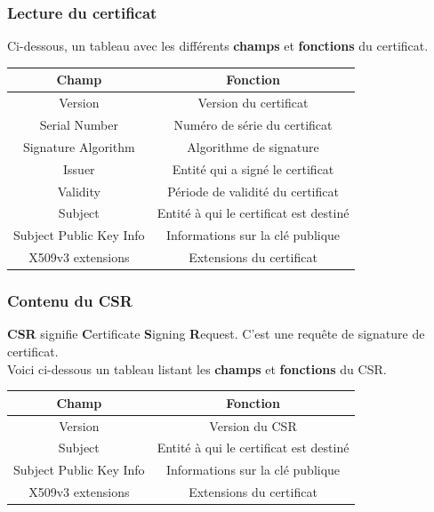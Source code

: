 \documentclass[12pt, a4paper]{article}
\begin{document}
    \subsubsection{Lecture du certificat}
    Ci-dessous, un tableau avec les différents \textbf{champs}
    et \textbf{fonctions} du certificat.
    \begin{center}
        \begin{tabular}{|c|c|}
            \hline
            \textbf{Champ} & \textbf{Fonction} \\
            \hline
            Version & Version du certificat \\
            \hline
            Serial Number & Numéro de série du certificat \\
            \hline
            Signature Algorithm & Algorithme de signature \\
            \hline
            Issuer & Entité qui a signé le certificat \\
            \hline
            Validity & Période de validité du certificat \\
            \hline
            Subject & Entité à qui le certificat est destiné \\
            \hline
            Subject Public Key Info & Informations sur la clé publique \\
            \hline
            X509v3 extensions & Extensions du certificat \\
            \hline
        \end{tabular}
    \end{center}

    \subsubsection{Contenu du CSR}
    \textbf{CSR} signifie \textbf{C}ertificate \textbf{S}igning \textbf{R}equest. C'est une requête de signature de certificat.\\
    Voici ci-dessous un tableau listant les \textbf{champs} et \textbf{fonctions} du CSR.
    \begin{center}
        \begin{tabular}{|c|c|}
            \hline
            \textbf{Champ} & \textbf{Fonction} \\
            \hline
            Version & Version du CSR \\
            \hline
            Subject & Entité à qui le certificat est destiné \\
            \hline
            Subject Public Key Info & Informations sur la clé publique \\
            \hline
            X509v3 extensions & Extensions du certificat \\
            \hline
        \end{tabular}
    \end{center}
\end{document}
